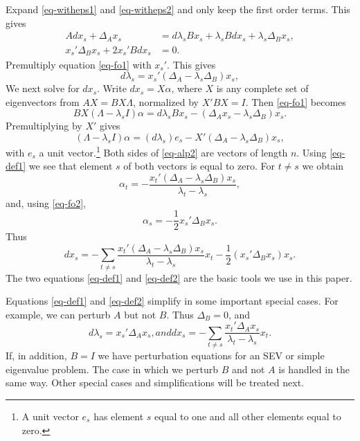 \documentclass[
  12pt,
  letterpaper,
  DIV=11,
  numbers=noendperiod]{scrartcl}
\begin{document}
Expand \eqref{eq-witheps1} and \eqref{eq-witheps2} and only keep the
first order terms. This gives \begin{subequations}
\begin{align}
Adx_s+\Delta_Ax_s&=d\lambda_s Bx_s+\lambda_sBdx_s+\lambda_s\Delta_Bx_s,\label{eq-fo1}\\
x_s'\Delta_Bx_s+2x_s'Bdx_s&=0.\label{eq-fo2}
\end{align}
\end{subequations} Premultiply equation \eqref{eq-fo1} with \(x_s'\).
This gives \begin{equation}
d\lambda_s=x_s'(\Delta_A-\lambda_s\Delta_B)x_s,\label{eq-def1}
\end{equation} We next solve for \(dx_s\). Write \(dx_s=X\alpha\), where
\(X\) is any complete set of eigenvectors from \(AX=BX\Lambda\),
normalized by \(X'BX=I\). Then \eqref{eq-fo1} becomes \begin{equation}
BX(\Lambda-\lambda_sI)\alpha=d\lambda_s Bx_s-(\Delta_Ax_s-\lambda_s\Delta_B)x_s.\label{eq-alp1}
\end{equation} Premultiplying by \(X'\) gives \begin{equation}
(\Lambda-\lambda_sI)\alpha=(d\lambda_s)e_s-X'(\Delta_A-\lambda_s\Delta_B)x_s,\label{eq-alp2}
\end{equation} with \(e_s\) a unit
vector.\footnote{A unit vector $e_s$ has element $s$ equal to one and all other elements equal to zero.}
Both sides of \eqref{eq-alp2} are vectors of length \(n\). Using
\eqref{eq-def1} we see that element \(s\) of both vectors is equal to
zero. For \(t\not= s\) we obtain \begin{equation}
\alpha_t=-\frac{x_t'(\Delta_A-\lambda_s\Delta_B)x_s}{\lambda_t-\lambda_s},\label{eq-alp3}
\end{equation} and, using \eqref{eq-fo2}, \begin{equation}
\alpha_s=-\frac12x_s'\Delta_Bx_s.\label{eq-alp3}
\end{equation} Thus \begin{equation}
dx_s=-\sum_{t\not= s}\frac{x_t'(\Delta_A-\lambda_s\Delta_B)x_s}{\lambda_t-\lambda_s}x_t-\frac12(x_s'\Delta_Bx_s)x_s.\label{eq-def2}
\end{equation} The two equations \eqref{eq-def1} and \eqref{eq-def2} are
the basic tools we use in this paper.

Equations \eqref{eq-def1} and \eqref{eq-def2} simplify in some important
special cases. For example, we can perturb \(A\) but not \(B\). Thus
\(\Delta_B=0\), and \begin{subequations}
\begin{equation}
d\lambda_s=x_s'\Delta_Ax_s\label{eq-sim1},
\end{equation}
and
\begin{equation}
dx_s=-\sum_{t\not= s}\frac{x_t'\Delta_Ax_s}{\lambda_t-\lambda_s}x_t.\label{eq-sim2}
\end{equation}
\end{subequations} If, in addition, \(B=I\) we have perturbation
equations for an SEV or simple eigenvalue problem. The case in which we
perturb \(B\) and not \(A\) is handled in the same way. Other special
cases and simplifications will be treated next.
\end{document}
